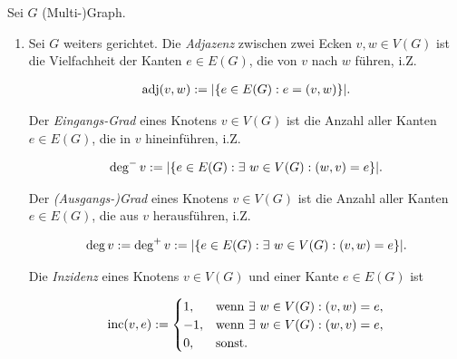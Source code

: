         \begin{definition} \label{def:adjacency_degree_incidence}

            Sei $G$ (Multi-)Graph.

            \begin{enumerate}[
                wide,
                labelindent = 0pt
            ]

                \item Sei $G$ weiters gerichtet.
                Die \textit{Adjazenz} zwischen zwei Ecken $v, w \in V(G)$ ist die Vielfachheit der Kanten $e \in E(G)$, die von $v$ nach $w$ führen, i.Z.

                \begin{align*}
                    \operatorname{adj}(v, w)
                    :=
                    |{\left \{ e \in E(G): e = (v, w) \right \}}|.
                \end{align*}

                Der \textit{Eingangs-Grad} eines Knotens $v \in V(G)$ ist die Anzahl aller Kanten $e \in E(G)$, die in $v$ hineinführen, i.Z.

                \begin{align*}
                    \deg^- v
                    :=
                    |{\left \{ e \in E(G): \exists ~ w \in V(G): (w, v) = e \right \}}|.
                \end{align*}

                Der \textit{(Ausgangs-)Grad} eines Knotens $v \in V(G)$ ist die Anzahl aller Kanten $e \in E(G)$, die aus $v$ herausführen, i.Z.

                \begin{align*}
                    \deg v
                    :=
                    \deg^+ v
                    :=
                    |{\left \{ e \in E(G): \exists ~ w \in V(G): (v, w) = e \right \}}|.
                \end{align*}

                Die \textit{Inzidenz} eines Knotens $v \in V(G)$ und einer Kante $e \in E(G)$ ist

                \begin{align*}
                    \operatorname{inc}(v, e)
                    :=
                    \begin{cases}
                        1,  & \text{wenn}~ \exists ~ w \in V(G): (v, w) = e, \\
                        -1, & \text{wenn}~ \exists ~ w \in V(G): (w, v) = e, \\
                        0,  & \text{sonst}.
                    \end{cases}
                \end{align*}


\end{enumerate}
\end{definition}

